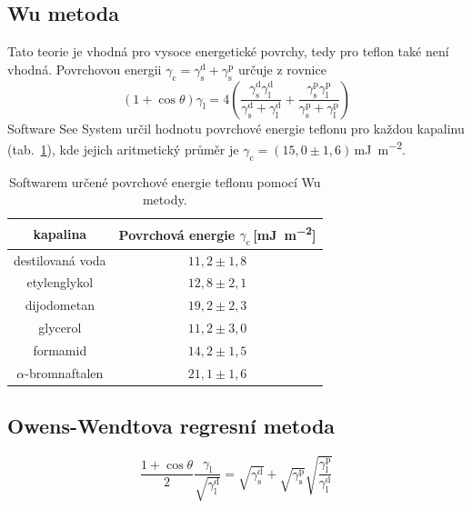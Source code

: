 \documentclass{protokol}
\begin{document}
\subsection{Wu metoda}
\par Tato teorie je vhodná pro vysoce energetické povrchy, tedy pro teflon také 
není vhodná. Povrchovou energii $\gamma_{\text{c}} = 
\gamma_{\text{s}}^{\text{d}} + \gamma_{\text{s}}^{\text{p}}$ určuje z rovnice
\begin{equation}
	\left(1+\cos\theta\right)\gamma_{\text{l}} = 
	4\left(\frac{\gamma_{\text{s}}^\text{d}\gamma_{\text{l}}^\text{d}}{\gamma_{\text{s}}^\text{d}
	 + \gamma_{\text{l}}^\text{d}} + 
	\frac{\gamma_{\text{s}}^\text{p}\gamma_{\text{l}}^\text{p}}{\gamma_{\text{s}}^\text{p}
	 + \gamma_{\text{l}}^\text{p}}\right)
\end{equation}
Software See System určil hodnotu povrchové energie teflonu pro každou 
kapalinu (tab.~\ref{table:Wu}), kde jejich aritmetický průměr je 
$\gamma_{\text{c}} = (15,0\pm1,6)$\,\si{\milli\joule\per\meter\squared}.

\begin{table}[h]
	\caption{Softwarem určené povrchové energie teflonu pomocí Wu metody.}
	\label{table:Wu}
	\begin{tabular}{|c|c|}\hline
		kapalina  & Povrchová energie 
		$\gamma_{\text{c}}$\,[\si{\milli\joule\per\meter\squared}] \\ \hline
		destilovaná voda & $11,2 \pm 1,8$     \\
		etylenglykol     & $12,8 \pm 2,1$     \\
		dijodometan      & $19,2 \pm 2,3$     \\
		glycerol         & $11,2 \pm 3,0$     \\
		formamid         & $14,2 \pm 1,5$     \\
		$\alpha$-bromnaftalen & $21,1 \pm 1,6$\\ \hline
	\end{tabular}
\end{table}

\subsection{Owens-Wendtova regresní metoda}
\begin{equation}
	\frac{1+\cos\theta}{2}\frac{\gamma_{\text{l}}}{\sqrt{\gamma_{\text{l}}^\text{d}}}
	 = \sqrt{\gamma_{\text{s}}^\text{d}} + \sqrt{\gamma_{\text{s}}^\text{p}} 
	 \sqrt{\frac{\gamma_{\text{l}}^\text{p}}{\gamma_{\text{l}}^\text{d}}}
\end{equation}
\par 
\end{document}
